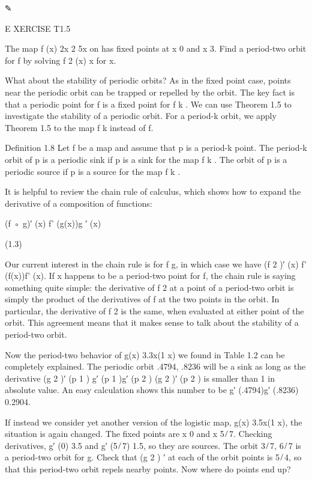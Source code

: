 \documentclass[12pt]{article}
\begin{document}
✎

E XERCISE T1.5

The map f (x)  2x 2  5x on has ﬁxed points at x  0 and x  3. Find a period-two orbit for f by solving f 2 
(x)  x for x.

What about the stability of periodic orbits? As in the ﬁxed point case, points near the periodic orbit can 
be trapped or repelled by the orbit. The key fact is that a periodic point for f is a ﬁxed point for f k . 
We can use Theorem 1.5 to investigate the stability of a periodic orbit. For a period-k orbit, we apply 
Theorem 1.5 to the map f k instead of f.


Deﬁnition 1.8 Let f be a map and assume that p is a period-k point. The period-k orbit of p is a periodic 
sink if p is a sink for the map f k . The orbit of p is a periodic source if p is a source for the map f k 
.

It is helpful to review the chain rule of calculus, which shows how to expand the derivative of a 
composition of functions:

(f ◦ g)′ (x)  f' (g(x))g ′ (x)

(1.3)

Our current interest in the chain rule is for f  g, in which case we have (f 2 )′ (x)  f' (f(x))f' (x). If 
x happens to be a period-two point for f, the chain rule is saying something quite simple: the derivative 
of f 2 at a point of a period-two orbit is simply the product of the derivatives of f at the two points in 
the orbit. In particular, the derivative of f 2 is the same, when evaluated at either point of the orbit. 
This agreement means that it makes sense to talk about the stability of a period-two orbit.

Now the period-two behavior of g(x)  3.3x(1  x) we found in Table 1.2 can be completely explained. The 
periodic orbit .4794, .8236  will be a sink as long as the derivative (g 2 )′ (p 1 )  g′ (p 1 )g′ (p 2 )  
(g 2 )′ (p 2 ) is smaller than 1 in absolute value. An easy calculation shows this number to be g′ 
(.4794)g′ (.8236)  0.2904.

If instead we consider yet another version of the logistic map, g(x)  3.5x(1  x), the situation is again 
changed. The ﬁxed points are x  0 and x  5 ̸ 7. Checking derivatives, g′ (0)  3.5 and g′ (5 ̸ 7)  1.5, so 
they are sources. The orbit 3 ̸ 7, 6 ̸ 7  is a period-two orbit for g. Check that (g 2 ) ′ at each of the 
orbit points is 5 ̸ 4, so that this period-two orbit repels nearby points. Now where do points end up?
\end{document}
